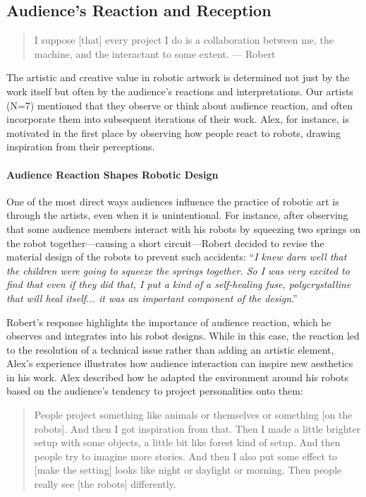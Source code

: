 \subsection{Audience's Reaction and Reception}

\begin{quote}
    I suppose [that] every project I do is a collaboration between me, the machine, and the interactant to some extent. --- Robert
\end{quote}

The artistic and creative value in robotic artwork is determined not just by the work itself but often by the audience’s reactions and interpretations. Our artists (N=7) mentioned that they observe or think about audience reaction, and often incorporate them into subsequent iterations of their work. Alex, for instance, is motivated in the first place by observing how people react to robots, drawing inspiration from their perceptions.

\paragraph{Audience Reaction Shapes Robotic Design}
One of the most direct ways audiences influence the practice of robotic art is through the artists, even when it is unintentional. For instance, after observing that some audience members interact with his robots by squeezing two springs on the robot together---causing a short circuit---Robert decided to revise the material design of the robots to prevent such accidents: ``\textit{I knew darn well that the children were going to squeeze the springs together. So I was very excited to find that even if they did that, I put a kind of a self-healing fuse, polycrystalline that will heal itself... it was an important component of the design}.''

Robert’s response highlights the importance of audience reaction, which he observes and integrates into his robot designs. While in this case, the reaction led to the resolution of a technical issue rather than adding an artistic element,  Alex's experience illustrates how audience interaction can inspire new aesthetics in his work. Alex described how he adapted the environment around his robots based on the audience’s tendency to project personalities onto them:

\begin{quote}
    People project something like animals or themselves or something [on the robots]. And then I got inspiration from that. Then I made a little brighter setup with some objects, a little bit like forest kind of setup. And then people try to imagine more stories. And then I also put some effect to [make the setting] looks like night or daylight or morning. Then people really see [the robots] differently.
\end{quote}


